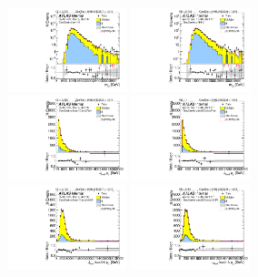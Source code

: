 \begin{figure}[htbp!]
\begin{center}
\includegraphics[width=0.31\textwidth,angle=-90]{figures/boosted/Prereweight/Moriond_TwoTag_split_Control_mHH_l_1.pdf}
\includegraphics[width=0.31\textwidth,angle=-90]{figures/boosted/Control/b77_TwoTag_split_Control_mHH_l_1.pdf}\\
\includegraphics[width=0.31\textwidth,angle=-90]{figures/boosted/Prereweight/Moriond_TwoTag_split_Control_leadHCand_Pt_m.pdf}
\includegraphics[width=0.31\textwidth,angle=-90]{figures/boosted/Control/b77_TwoTag_split_Control_leadHCand_Pt_m.pdf}\\
\includegraphics[width=0.31\textwidth,angle=-90]{figures/boosted/Prereweight/Moriond_TwoTag_split_Control_leadHCand_trk0_Pt.pdf}
\includegraphics[width=0.31\textwidth,angle=-90]{figures/boosted/Control/b77_TwoTag_split_Control_leadHCand_trk0_Pt.pdf}\\

\end{center}
\end{figure}
